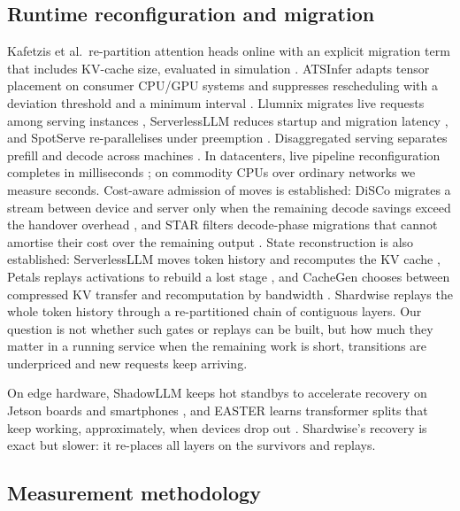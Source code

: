 \documentclass[preprint,12pt]{elsarticle}
\begin{document}
\hypertarget{runtime-reconfiguration-and-migration}{%
\subsection{Runtime reconfiguration and
migration}\label{runtime-reconfiguration-and-migration}}

Kafetzis et al.~re-partition attention heads online with an explicit
migration term that includes KV-cache size, evaluated in simulation
\citep{kafetzis2025partitioning}. ATSInfer adapts tensor placement on
consumer CPU/GPU systems and suppresses rescheduling with a deviation
threshold and a minimum interval \citep{liu2026atsinfer}. Llumnix
migrates live requests among serving instances \citep{sun2024llumnix},
ServerlessLLM reduces startup and migration latency
\citep{fu2024serverlessllm}, and SpotServe re-parallelises under
preemption \citep{miao2023spotserve}. Disaggregated serving separates
prefill and decode across machines
\citep{patel2024splitwise, zhong2024distserve}. In datacenters, live
pipeline reconfiguration completes in milliseconds
\citep{bai2026pipelive, yuan2026remp}; on commodity CPUs over ordinary
networks we measure seconds. Cost-aware admission of moves is
established: DiSCo migrates a stream between device and server only when
the remaining decode savings exceed the handover overhead
\citep{sun-etal-2025-disco}, and STAR filters decode-phase migrations
that cannot amortise their cost over the remaining output
\citep{star2026}. State reconstruction is also established:
ServerlessLLM moves token history and recomputes the KV cache
\citep{fu2024serverlessllm}, Petals replays activations to rebuild a
lost stage \citep{borzunov2023petals}, and CacheGen chooses between
compressed KV transfer and recomputation by bandwidth
\citep{cachegen2024}. Shardwise replays the whole token history through
a re-partitioned chain of contiguous layers. Our question is not whether
such gates or replays can be built, but how much they matter in a
running service when the remaining work is short, transitions are
underpriced and new requests keep arriving.

On edge hardware, ShadowLLM keeps hot standbys to accelerate recovery on
Jetson boards and smartphones \citep{chen2026shadowllmhotstandby}, and
EASTER learns transformer splits that keep working, approximately, when
devices drop out \citep{easter2024}. Shardwise's recovery is exact but
slower: it re-places all layers on the survivors and replays.

\hypertarget{measurement-methodology}{%
\subsection{Measurement methodology}\label{measurement-methodology}}
\end{document}
